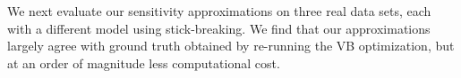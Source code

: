 We next evaluate our sensitivity approximations on three real data sets, each with a different model using stick-breaking. We find that our approximations largely agree with ground truth obtained by re-running the VB optimization, but at an order of magnitude less computational cost.